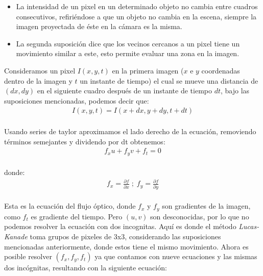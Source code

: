 \documentclass{iccmemoria}
\begin{document}
\begin{itemize}
\item La intensidad de un pixel en un determinado objeto no cambia entre cuadros consecutivos, refiriéndose a que un objeto no cambia en la escena, siempre la imagen proyectada de éste en la cámara es la misma.

\item La segunda suposición dice que los vecinos cercanos a un pixel tiene un movimiento similar a este, esto permite evaluar una zona en la imagen.
\end{itemize}

Consideramos un pixel $I(x, y,t)$ en la primera imagen ($x$ e $y$ coordenadas dentro de la imagen y $t$ un instante de tiempo) el cual se mueve una distancia de $(dx, dy)$ en el siguiente cuadro después de un instante de tiempo $dt$, bajo las suposiciones mencionadas, podemos decir que:\\

\begin{equation}
	\begin{split}
		I(x,y,t) = I(x+dx, y+dy, t+dt)
	\end{split}
\end{equation}
\\

Usando series de taylor aproximamos el lado derecho de la ecuación, removiendo términos semejantes y dividendo por dt obtenemos:\\

\begin{equation}
	\begin{split}
		f_x u + f_y v + f_t = 0
	\end{split}
\end{equation}\\

donde:\\

\begin{equation}
	\begin{split}
		f_x = \frac{\partial f}{\partial x} \; ; \; f_y = \frac{\partial f}{\partial y}
	\end{split}
\end{equation}\\

Esta es la ecuación del flujo óptico, donde $f_x$ y $f_y$ son gradientes de la imagen, como $f_t$ es gradiente del tiempo. Pero $(u, v)$ son desconocidas, por lo que no podemos resolver la ecuación con dos incognitas. Aquí es donde el método \emph{Lucas-Kanade} toma grupos de pixeles de 3x3, considerando las suposiciones mencionadas anteriormente, donde estos tiene el mismo movimiento. Ahora es posible resolver $(f_x, f_y, f_t)$ ya que contamos con nueve ecuaciones y las mismas dos incógnitas, resultando con la siguiente ecuación:\\
\end{document}

